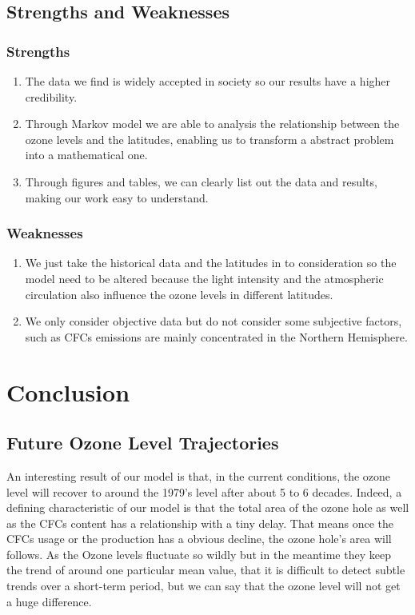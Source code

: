 \documentclass[12pt]{article}
\begin{document}
\subsection{Strengths and Weaknesses}
\subsubsection{Strengths}
\begin{enumerate}
\item The data we find is widely accepted in society so our results have a higher credibility.
\item Through Markov model we are able to analysis the relationship between the ozone levels and the latitudes, enabling us to transform a abstract problem into a mathematical one.
\item Through figures and tables, we can clearly list out the data and results, making our work easy to understand.
\end{enumerate}
\subsubsection{Weaknesses}
\begin{enumerate}
\item We just take the historical data and the latitudes in to consideration so the model need to be altered because the light intensity and the atmospheric circulation also influence the ozone levels in different latitudes.
\item We only consider objective data but do not consider some subjective factors, such as CFCs emissions are mainly concentrated in the Northern Hemisphere.
\end{enumerate}





\section{Conclusion}
\subsection{Future Ozone Level Trajectories}
An interesting result of our model is that, in the current conditions, the ozone level will recover to around the 1979's level after about 5 to 6 decades. Indeed, a defining characteristic of our model is that the total area of the ozone hole as well as the CFCs content has a relationship with a tiny delay. That means once the CFCs usage or the production has a obvious decline, the ozone hole's area will follows. 
As the Ozone levels fluctuate so wildly but in the meantime they keep the trend of around one particular mean value, that it is difficult to detect subtle trends over a short-term period, but we can say that the ozone level will not get a huge difference. 
\end{document}
